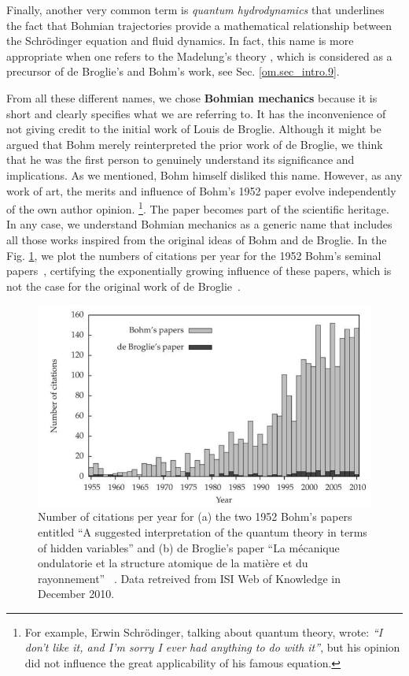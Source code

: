 \documentclass[onecolumn,nofootinbib, secnumarabic, amsmath, nobibnotes,12pt,aps,pra]{revtex4-1}
\newcommand{\fref}[1]{Fig. \ref{#1}}
\newcommand{\sref}[1]{Sec. \ref{#1}}
\begin{document}
\newpage

Finally, another very common term is \emph{quantum hydrodynamics} \cite{om.wyatt2005} that underlines the fact that Bohmian trajectories provide a mathematical relationship between the Schr\"odinger equation and fluid dynamics. In fact, this name is more appropriate when one refers to the Madelung's theory \cite{om.Madelung}, which is considered as a precursor of de Broglie's and Bohm's work, see \sref{om.sec_intro.9}.

From all these different names, we chose \textbf{Bohmian mechanics} because it is short and clearly specifies what we are referring to. It has the inconvenience of not giving credit to the initial work of Louis de Broglie.
Although it might be argued that Bohm merely reinterpreted the prior work of de Broglie, we think that he was the first person to genuinely understand its significance and implications. As we mentioned, Bohm himself disliked this name. However, as any work of art, the merits and influence of Bohm's 1952 paper evolve independently of the own author opinion. \footnote{For example, Erwin Schr\"odinger, talking about quantum theory, wrote: \emph{``I don't like it, and I'm sorry I ever had anything to do with it''}, but his opinion did not influence the great applicability of his famous equation.}. The paper becomes part of the scientific heritage.
In any case, we understand Bohmian mechanics as a generic name that includes all those works inspired from the original ideas of Bohm and de Broglie. In the \fref{om_Datos_Bohm}, we plot the numbers of citations per year for the 1952 Bohm's seminal papers~\cite{om.bohm1952a,om.bohm1952b}, certifying the exponentially growing influence of these papers, which is not the case for the original work of de Broglie~\cite{om.debroglie1927b}.

\begin{figure}
\centering
\includegraphics*[width=13cm]{F0_citations_opt.pdf}
\caption{Number of citations per year for (a) the two 1952 Bohm's papers entitled ``A suggested interpretation of the quantum theory in terms of hidden variables'' \cite{om.bohm1952a,om.bohm1952b} and (b) de Broglie's paper ``La m\'ecanique ondulatorie et la structure atomique de la mati\`ere et du rayonnement'' ~\cite{om.debroglie1927b}. Data retreived from ISI Web of Knowledge \cite{om.isiweb} in December 2010.}
\nonumber
\label{om_Datos_Bohm}
\end{figure}
\end{document}
